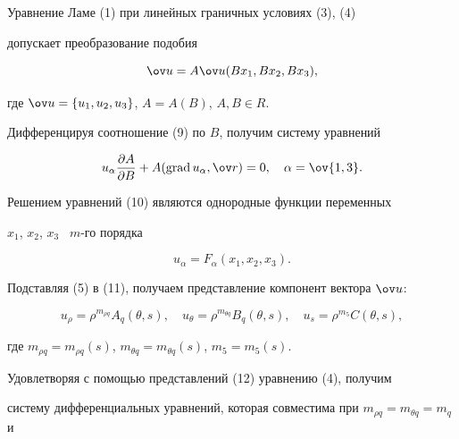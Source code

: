 \begin{pf} 


Уравнение Ламе (1) при линейных граничных условиях (3), (4)  


допускает преобразование подобия 


\begin{equation} 


\ov u=A\ov u(Bx_1,Bx_2,Bx_3), 


\end{equation} 


где $\ov u=\{u_1,u_2,u_3\}$, $A=A(B)$, $A,B\in R$. 


Дифференцируя соотношение (9) по $B$, получим систему уравнений  


\begin{equation} 


u_\alpha\frac{\partial A}{\partial B}+A(\Grad u_\alpha,\ov r)=0,\quad 


\alpha=\ov{1,3}. 


\end{equation} 


 


Решением уравнений (10) являются однородные функции переменных  


$x_1$, $x_2$, $x_3$ \ $m$-го порядка  


\begin{equation} 


u_\alpha=F_\alpha(x_1,x_2,x_3). 


\end{equation} 


Подставляя (5) в (11), получаем представление компонент вектора $\ov u$: 


\begin{equation} 


u_\rho=\rho^{m_{\rho q}}A_q(\theta,s),\quad 


u_\theta=\rho^{m_{\theta q}}B_q(\theta,s),\quad 


u_s=\rho^{m_5}C(\theta,s), 


\end{equation} 


где $m_{\rho q}=m_{\rho q}(s)$, $m_{\theta q}=m_{\theta q}(s)$, $m_5=m_5(s)$. 


Удовлетворяя с помощью представлений (12) уравнению (4), получим  


систему дифференциальных уравнений, которая совместима при $m_{\rho 


q}=m_{\theta q}=m_q$ и  



\end{pf}
